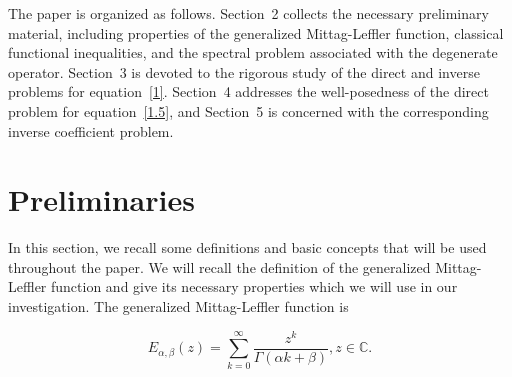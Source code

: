 \documentclass[reqno]{amsart}
\theoremstyle{definition}
\numberwithin{equation}{section}
\begin{document}
The paper is organized as follows. Section~2 collects the necessary preliminary
material, including properties of the generalized Mittag-Leffler function, classical
functional inequalities, and the spectral problem associated with the degenerate
operator. Section~3 is devoted to the rigorous study of the direct and inverse problems
for equation~\eqref{1}. Section~4 addresses the well-posedness of the direct
problem for equation~\eqref{1.5}, and Section~5 is concerned with the corresponding
inverse coefficient problem.















\section{Preliminaries}

In this section, we recall some definitions and basic concepts that will be used throughout the paper. 
We will recall the definition of the generalized Mittag-Leffler function and give its necessary properties which we will use in our investigation. The
generalized Mittag-Leffler function is

\begin{equation*}
    E_{\alpha, \beta}(z)=\sum_{k=0}^{\infty} \frac{z^k}{\Gamma( \alpha k+\beta)}, z \in \mathbb{C} .
\end{equation*}
\end{document}
